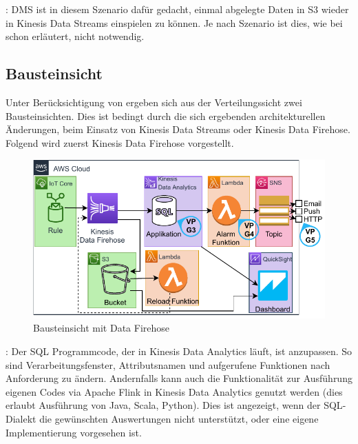 : \ac{DMS} ist in diesem Szenario dafür gedacht, einmal abgelegte Daten in S3 wieder in Kinesis Data Streams einspielen zu können. Je nach Szenario ist dies, wie bei  schon erläutert, nicht notwendig.

\subsection{Bausteinsicht}\label{subsection:Bausteinsich-E}
Unter Berücksichtigung von  ergeben sich aus der Verteilungssicht zwei Bausteinsichten. Dies ist bedingt durch die sich ergebenden architekturellen Änderungen, beim Einsatz von Kinesis Data Streams oder Kinesis Data Firehose. Folgend wird zuerst Kinesis Data Firehose vorgestellt.

\begin{figure}[H]
\centering
\includegraphics[width=\textwidth]{graphics/Echtzeit-RA-Elements-Firehose.pdf}
\caption{Bausteinsicht mit Data Firehose}
\label{abb:ElementeEchtzeitRA}
\end{figure}

: Der \ac{SQL} Programmcode, der in Kinesis Data Analytics läuft, ist anzupassen. So sind Verarbeitungsfenster, Attributsnamen und aufgerufene Funktionen nach Anforderung zu ändern. Andernfalls kann auch die Funktionalität zur Ausführung eigenen Codes via Apache Flink in Kinesis Data Analytics genutzt werden (dies erlaubt Ausführung von Java, Scala, Python). Dies ist angezeigt, wenn der \ac{SQL}-Dialekt die gewünschten Auswertungen nicht unterstützt, oder eine eigene Implementierung vorgesehen ist.

